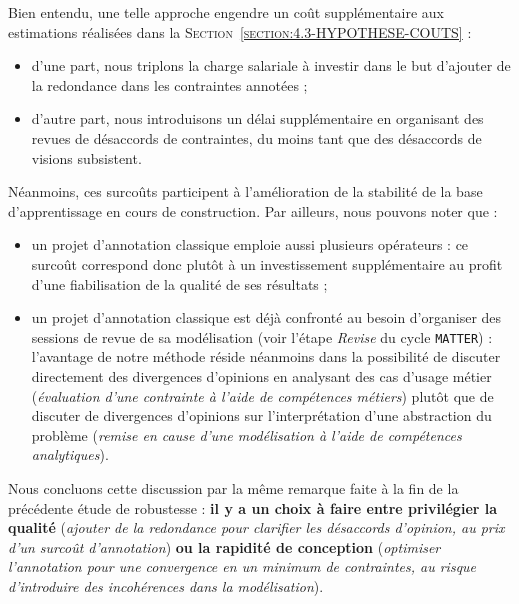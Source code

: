 			Bien entendu, une telle approche engendre un coût supplémentaire aux estimations réalisées dans la \textsc{Section~\ref{section:4.3-HYPOTHESE-COUTS}} :
			\begin{itemize}
				\item d'une part, nous triplons la charge salariale à investir dans le but d'ajouter de la redondance dans les contraintes annotées ;
				\item d'autre part, nous introduisons un délai supplémentaire en organisant des revues de désaccords de contraintes, du moins tant que des désaccords de visions subsistent.
			\end{itemize}
			Néanmoins, ces surcoûts participent à l'amélioration de la stabilité de la base d'apprentissage en cours de construction.
			Par ailleurs, nous pouvons noter que :
			\begin{itemize}
				\item un projet d'annotation classique emploie aussi plusieurs opérateurs : ce surcoût correspond donc plutôt à un investissement supplémentaire au profit d'une fiabilisation de la qualité de ses résultats ;
				\item un projet d'annotation classique est déjà confronté au besoin d'organiser des sessions de revue de sa modélisation (voir l'étape \textit{Revise} du cycle \texttt{MATTER}) : l'avantage de notre méthode réside néanmoins dans la possibilité de discuter directement des divergences d'opinions en analysant des cas d'usage métier (\textit{évaluation d'une contrainte à l'aide de compétences métiers}) plutôt que de discuter de divergences d'opinions sur l'interprétation d'une abstraction du problème (\textit{remise en cause d'une modélisation à l'aide de compétences analytiques}).
			\end{itemize}
			
			\begin{leftBarAuthorOpinion}
				Nous concluons cette discussion par la même remarque faite à la fin de la précédente étude de robustesse : \textbf{il y a un choix à faire entre privilégier la qualité} (\textit{ajouter de la redondance pour clarifier les désaccords d'opinion, au prix d'un surcoût d'annotation}) \textbf{ou la rapidité de conception} (\textit{optimiser l'annotation pour une convergence en un minimum de contraintes, au risque d'introduire des incohérences dans la modélisation}).
			\end{leftBarAuthorOpinion}
	
